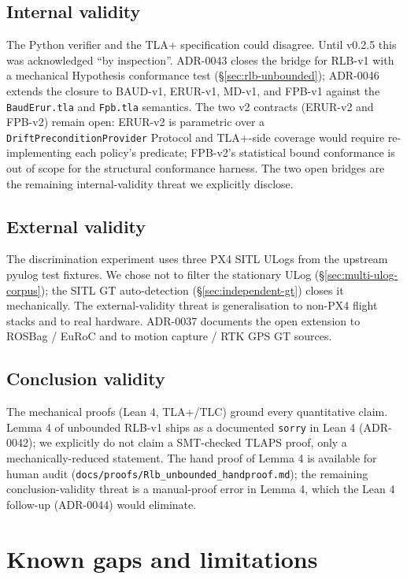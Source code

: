 \documentclass[11pt,a4paper]{article}
\begin{document}
\subsection{Internal validity}

The Python verifier and the TLA+ specification could disagree.
Until v0.2.5 this was acknowledged ``by inspection''. ADR-0043
closes the bridge for RLB-v1 with a mechanical Hypothesis
conformance test (\S\ref{sec:rlb-unbounded}); ADR-0046 extends
the closure to BAUD-v1, ERUR-v1, MD-v1, and FPB-v1 against the
\texttt{BaudErur.tla} and \texttt{Fpb.tla} semantics. The two
v2 contracts (ERUR-v2 and FPB-v2) remain open: ERUR-v2 is
parametric over a \texttt{DriftPreconditionProvider} Protocol
and TLA+-side coverage would require re-implementing each
policy's predicate; FPB-v2's statistical bound conformance is
out of scope for the structural conformance harness. The two
open bridges are the remaining internal-validity threat we
explicitly disclose.

\subsection{External validity}

The discrimination experiment uses three PX4 SITL ULogs from
the upstream pyulog test fixtures. We chose not to filter the
stationary ULog (\S\ref{sec:multi-ulog-corpus}); the SITL GT
auto-detection (\S\ref{sec:independent-gt}) closes it
mechanically. The external-validity threat is generalisation to
non-PX4 flight stacks and to real hardware. ADR-0037
documents the open extension to ROSBag / EuRoC and to motion
capture / RTK GPS GT sources.

\subsection{Conclusion validity}

The mechanical proofs (Lean 4, TLA+/TLC) ground every
quantitative claim. Lemma 4 of unbounded RLB-v1 ships as a
documented \texttt{sorry} in Lean 4 (ADR-0042); we explicitly
do not claim a SMT-checked TLAPS proof, only a
mechanically-reduced statement. The hand proof of Lemma 4 is
available for human audit
(\texttt{docs/proofs/Rlb\_unbounded\_handproof.md}); the
remaining conclusion-validity threat is a manual-proof error
in Lemma 4, which the Lean 4 follow-up (ADR-0044) would
eliminate.

\section{Known gaps and limitations}
\end{document}
